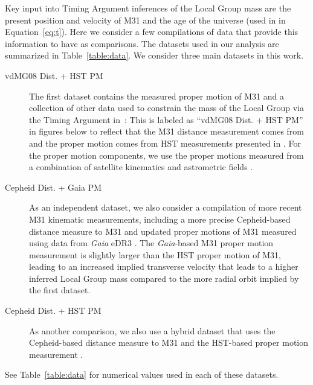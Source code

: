 \documentclass[twocolumn]{aastex631}
\begin{document}
Key input into Timing Argument inferences of the Local Group mass are the
present position and velocity of M31 and the age of the universe (used in in
Equation~\ref{eq:t}).
Here we consider a few compilations of data that provide this information to
have as comparisons.
The datasets used in our analysis are summarized in Table~\ref{table:data}.
We consider three main datasets in this work.
\begin{description}
  \item[vdMG08 Dist. + HST PM] The first dataset contains the measured proper
  motion of M31 and a collection of other data used to constrain the mass of the
  Local Group via the Timing Argument in~\citet{vdm2012}: This is labeled as
  ``vdMG08 Dist. + HST PM'' in figures below to reflect that the M31 distance
  measurement comes from \citet{vdm2008} and the proper motion comes from HST
  measurements presented in \citet{vdm2012}. For the proper motion components,
  we use the proper motions measured from a combination of satellite kinematics
  and astrometric fields \cite{vdm2012}.
  \item[Cepheid Dist. + Gaia PM] As an independent dataset, we also consider a
  compilation of more recent M31 kinematic measurements, including a more
  precise Cepheid-based distance measure to M31 \citep{Li2021} and updated
  proper motions of M31 measured using data from \textit{Gaia} eDR3
  \citep{Salomon2021}. The \textit{Gaia}-based M31 proper motion measurement is
  slightly larger than the HST proper motion of M31, leading to an increased
  implied transverse velocity that leads to a higher inferred Local Group mass
  compared to the more radial orbit implied by the first dataset.
  \item[Cepheid Dist. + HST PM] As another comparison, we also use a hybrid
  dataset that uses the Cepheid-based distance measure to M31 and the HST-based
  proper motion measurement \citep{Li2021,vdm2012}.
\end{description}
See Table~\ref{table:data} for numerical values used in each of these datasets.
\end{document}
